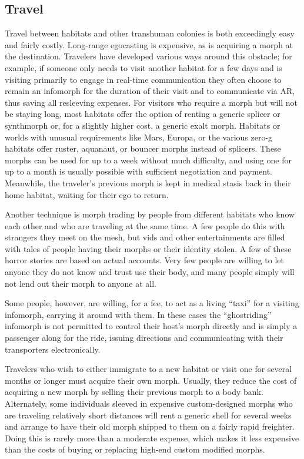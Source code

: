 \subsection{Travel}

Travel between habitats and other transhuman colonies
is both exceedingly easy and fairly costly. Long-range
egocasting is expensive, as is acquiring a morph
at the destination. Travelers have developed various 
ways around this obstacle; for example, if someone 
only needs to visit another habitat for a few days and 
is visiting primarily to engage in real-time communication
they often choose to remain an infomorph for
the duration of their visit and to communicate via AR, 
thus saving all resleeving expenses. For visitors who 
require a morph but will not be staying long, most 
habitats offer the option of renting a generic splicer 
or synthmorph or, for a slightly higher cost, a generic 
exalt morph. Habitats or worlds with unusual requirements
like Mars, Europa, or the various zero-g
habitats offer ruster, aquanaut, or bouncer morphs 
instead of splicers. These morphs can be used for up to 
a week without much difficulty, and using one for up 
to a month is usually possible with sufficient negotiation
and payment. Meanwhile, the traveler's previous
morph is kept in medical stasis back in their home 
habitat, waiting for their ego to return.

Another technique is morph trading by people from 
different habitats who know each other and who are 
traveling at the same time. A few people do this with 
strangers they meet on the mesh, but vids and other 
entertainments are filled with tales of people having 
their morphs or their identity stolen. A few of these 
horror stories are based on actual accounts. Very few 
people are willing to let anyone they do not know and 
trust use their body, and many people simply will not 
lend out their morph to anyone at all. 

Some people, however, are willing, for a fee, to act 
as a living ``taxi'' for a visiting infomorph, carrying 
it around with them. In these cases the ``ghostriding'' 
infomorph is not permitted to control their host's 
morph directly and is simply a passenger along for 
the ride, issuing directions and communicating with 
their transporters electronically.

Travelers who wish to either immigrate to a new 
habitat or visit one for several months or longer 
must acquire their own morph. Usually, they reduce 
the cost of acquiring a new morph by selling their 
previous morph to a body bank. Alternately, some 
individuals sleeved in expensive custom-designed 
morphs who are traveling relatively short distances 
will rent a generic shell for several weeks and arrange
to have their old morph shipped to them on
a fairly rapid freighter. Doing this is rarely more 
than a moderate expense, which makes it less expensive
than the costs of buying or replacing high-end
custom modified morphs.


